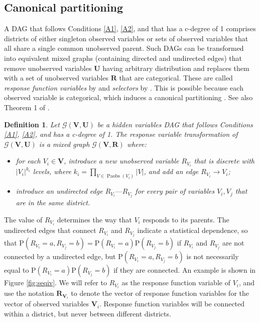 \documentclass[12pt]{article}
\newtheorem{definition}{Definition}
\def\Pr{{\mathrm{P}}}
\DeclareMathOperator{\Paobs}{Paobs}
\newcommand{\bU}{\boldsymbol{U}}
\newcommand{\bV}{\boldsymbol{V}}
\newcommand{\bR}{\boldsymbol{R}}
\begin{document}
\clearpage


\subsection{Canonical partitioning} \label{sec:respvar}

A DAG that follows Conditions \ref{A1}, \ref{A2}, and that has a c-degree of 1 comprises districts of either singleton observed variables or sets of observed variables that all share a single common unobserved parent. Such DAGs can be transformed into equivalent mixed graphs (containing directed and undirected edges) that remove unobserved variables $\bU$ having arbitrary distribution and replaces them with a set of unobserved variables $\boldsymbol{R}$ that are categorical. These are called \emph{response function variables} by \citet{balke1994counterfactual} and \emph{selectors} by \citet{bonet2001instrumentality}. This is possible because each observed variable is categorical, which induces a canonical partitioning \citep{Pearl2000causality}. See also Theorem 1 of \citet{sachs2023general}. 

\begin{definition}
Let $\mathcal{G}(\bV, \bU)$ be a hidden variables DAG that follows Conditions \ref{A1}, \ref{A2}, and has a c-degree of 1. The \emph{response variable transformation} of $\mathcal{G}(\bV, \bU)$ is a mixed graph $\mathcal{G}(\bV, \bR)$ where: 
\begin{itemize}
    \item for each $V_i \in \bV$, introduce a new unobserved variable $R_{V_i}$ that is discrete with $|V_i|^{k_i}$ levels, where $k_i = \prod_{V \in \Paobs(V_i)}|V|$, and add an edge $R_{V_i} \rightarrow V_i$; 
    \item introduce an undirected edge $R_{V_i} \text{---} R_{V_j}$ for every pair of variables $V_i, V_j$ that are in the same district.
\end{itemize}
\end{definition}

The value of $R_{V_i}$ determines the way that $V_i$ responds to its parents. The undirected edges that connect $R_{V_i}$ and $R_{V_j}$ indicate a statistical dependence, so that $\Pr(R_{V_i} = a, R_{V_j} = b) = \Pr(R_{V_i} = a)\Pr(R_{V_j} = b)$ if $R_{V_i}$ and $R_{V_j}$ are not connected by a undirected edge, but $\Pr(R_{V_i} = a, R_{V_j} = b)$ is not necessarily equal to $\Pr(R_{V_i} = a)\Pr(R_{V_j} = b)$ if they are connected. An example is shown in Figure \ref{fig:seqiv}. We will refer to $R_{V_i}$ as the response function variable of $V_i$, and use the notation $\boldsymbol{R}_{\bV_i}$ to denote the vector of response function variables for the vector of observed variables $\bV_i$. Response function variables will be connected within a district, but never between different districts. 
\end{document}
